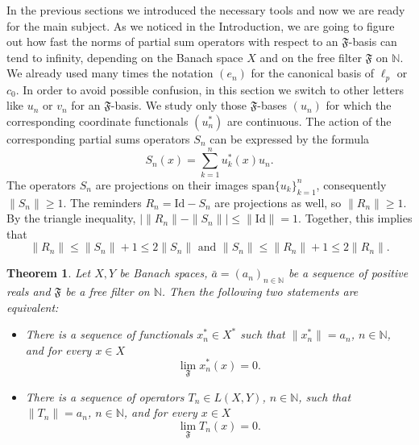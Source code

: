\documentclass[11pt,twoside, reqno]{amsart}
\newcommand{\N}{{\mathbb N}}
\newcommand{\F}{\mathfrak{F}}
\newcommand{\flim}{\lim\limits_\F }
\newcommand{\Id}{\mathrm{Id}}
\theoremstyle{plain}
\newtheorem{theorem}{Theorem}[section]
\theoremstyle{remark}
\theoremstyle{definition}
\numberwithin{equation}{section}
\begin{document}
In the previous sections we introduced the necessary tools and now we are ready for the main subject. As we noticed in the Introduction, we are going to figure out how fast the norms of partial sum operators with respect to an $\F$-basis can tend to infinity, depending on the Banach space $X$ and on the free filter $\F$ on $\N$. We already used many times the notation $(e_n)$ for the canonical basis of $\ell_p$ or $c_0$. In order to avoid possible confusion, in this section we switch to other letters like $u_n$ or $v_n$ for an $\F$-basis. We study only those $\F$-bases $(u_n)$ for which the corresponding coordinate functionals $(u_n^*)$ are continuous. The action of  the corresponding partial sums operators $S_n$ can be expressed by the formula
$$
S_n(x)=\sum_{k=1}^n u_k^*(x)u_n.
$$
The operators $S_n$ are projections on their images $\textrm{span}\{u_k\}_{k=1}^n$, consequently $\|S_n\| \ge 1$. The reminders $R_n = \Id - S_n$ are projections as well, so $\|R_n\| \ge 1$. By the triangle inequality, $\left|\|R_n\| - \|S_n\|\right| \le \|\Id\| = 1$. Together, this implies that 
\begin{equation} \label{ineqSnRn}
\|R_n\| \le \|S_n\| +1 \le 2\|S_n\| \textrm{ and } \|S_n\| \le \|R_n\| +1 \le 2\|R_n\|.
\end{equation}

\begin{theorem}  \label{f-op-thm1} Let $X, Y$ be Banach spaces, $\bar a = (a_n)_{n \in {\mathbb{N}}}$ be a sequence of positive reals and $\F$ be a free filter on $\N$.
Then the following two statements are equivalent:

\begin{itemize}
\item[(1)] There is a sequence of functionals $x_n^* \in X^*$ such that $\|x_n^*\|=a_n$, $n \in {\mathbb{N}}$, and for every $x \in X$
$$
\flim x_n^*(x) = 0.
$$

\item[(2)] There is a sequence of operators $T_n \in L(X,Y)$, $n \in {\mathbb{N}}$, such that $\|T_n\|=a_n$, $n \in {\mathbb{N}}$, and for every $x \in X$
$$
\flim T_n(x) = 0.
$$
\end{itemize}
\end{theorem}
\end{document}
